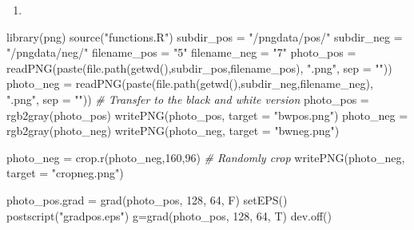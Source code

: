 \documentclass[
]{article}
\newenvironment{Shaded}{\begin{snugshade}}{\end{snugshade}}
\newcommand{\AttributeTok}[1]{\textcolor[rgb]{0.77,0.63,0.00}{#1}}
\newcommand{\CommentTok}[1]{\textcolor[rgb]{0.56,0.35,0.01}{\textit{#1}}}
\newcommand{\DecValTok}[1]{\textcolor[rgb]{0.00,0.00,0.81}{#1}}
\newcommand{\FunctionTok}[1]{\textcolor[rgb]{0.00,0.00,0.00}{#1}}
\newcommand{\NormalTok}[1]{#1}
\newcommand{\OtherTok}[1]{\textcolor[rgb]{0.56,0.35,0.01}{#1}}
\newcommand{\StringTok}[1]{\textcolor[rgb]{0.31,0.60,0.02}{#1}}
\providecommand{\tightlist}{%
  \setlength{\itemsep}{0pt}\setlength{\parskip}{0pt}}
\begin{document}
\begin{enumerate}
\def\labelenumi{(\alph{enumi})}
\tightlist
\item
\end{enumerate}

\begin{Shaded}
\begin{Highlighting}[]
\FunctionTok{library}\NormalTok{(png)}
\FunctionTok{source}\NormalTok{(}\StringTok{"functions.R"}\NormalTok{)}
\NormalTok{subdir\_pos }\OtherTok{=} \StringTok{"/pngdata/pos/"}
\NormalTok{subdir\_neg }\OtherTok{=} \StringTok{"/pngdata/neg/"}
\NormalTok{filename\_pos }\OtherTok{=} \StringTok{"5"}
\NormalTok{filename\_neg }\OtherTok{=} \StringTok{"7"}
\NormalTok{photo\_pos }\OtherTok{=} \FunctionTok{readPNG}\NormalTok{(}\FunctionTok{paste}\NormalTok{(}\FunctionTok{file.path}\NormalTok{(}\FunctionTok{getwd}\NormalTok{(),subdir\_pos,filename\_pos), }\StringTok{".png"}\NormalTok{, }\AttributeTok{sep =} \StringTok{""}\NormalTok{))}
\NormalTok{photo\_neg }\OtherTok{=} \FunctionTok{readPNG}\NormalTok{(}\FunctionTok{paste}\NormalTok{(}\FunctionTok{file.path}\NormalTok{(}\FunctionTok{getwd}\NormalTok{(),subdir\_neg,filename\_neg), }\StringTok{".png"}\NormalTok{, }\AttributeTok{sep =} \StringTok{""}\NormalTok{))}
\CommentTok{\# Transfer to the black and white version}
\NormalTok{photo\_pos }\OtherTok{=} \FunctionTok{rgb2gray}\NormalTok{(photo\_pos)}
\FunctionTok{writePNG}\NormalTok{(photo\_pos, }\AttributeTok{target =} \StringTok{"bwpos.png"}\NormalTok{)}
\NormalTok{photo\_neg }\OtherTok{=} \FunctionTok{rgb2gray}\NormalTok{(photo\_neg)}
\FunctionTok{writePNG}\NormalTok{(photo\_neg, }\AttributeTok{target =} \StringTok{"bwneg.png"}\NormalTok{)}

\NormalTok{photo\_neg }\OtherTok{=} \FunctionTok{crop.r}\NormalTok{(photo\_neg,}\DecValTok{160}\NormalTok{,}\DecValTok{96}\NormalTok{) }\CommentTok{\# Randomly crop}
\FunctionTok{writePNG}\NormalTok{(photo\_neg, }\AttributeTok{target =} \StringTok{"cropneg.png"}\NormalTok{)}

\NormalTok{photo\_pos.grad }\OtherTok{=} \FunctionTok{grad}\NormalTok{(photo\_pos, }\DecValTok{128}\NormalTok{, }\DecValTok{64}\NormalTok{, F)}
\FunctionTok{setEPS}\NormalTok{()}
\FunctionTok{postscript}\NormalTok{(}\StringTok{"gradpos.eps"}\NormalTok{)}
\NormalTok{g}\OtherTok{=}\FunctionTok{grad}\NormalTok{(photo\_pos, }\DecValTok{128}\NormalTok{, }\DecValTok{64}\NormalTok{, T)}
\FunctionTok{dev.off}\NormalTok{()}
\end{Highlighting}
\end{Shaded}
\end{document}
